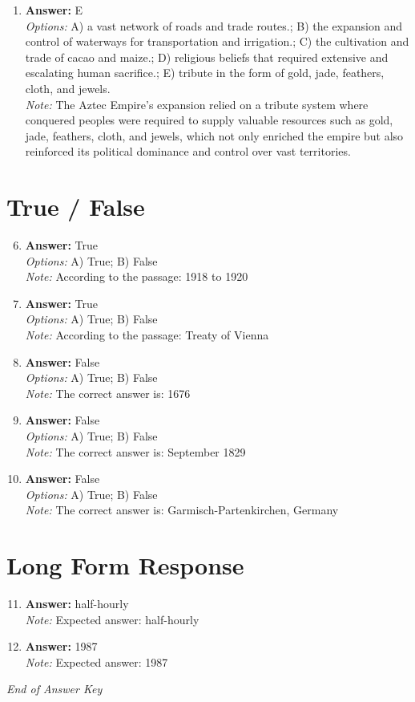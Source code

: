 \documentclass[12pt]{article}
\begin{document}
\begin{enumerate}[label=\arabic*.]
\\ \textit{Note:} The correct answer, 5100 B.P., corresponds to the earliest archaeological findings that indicate the use of metals, particularly in the context of ancient Andean civilizations, highlighting a significant development in metallurgy in South America during that period.
\item \textbf{Answer:} E
\\ \textit{Options:} A) a vast network of roads and trade routes.; B) the expansion and control of waterways for transportation and irrigation.; C) the cultivation and trade of cacao and maize.; D) religious beliefs that required extensive and escalating human sacrifice.; E) tribute in the form of gold, jade, feathers, cloth, and jewels.
\\ \textit{Note:} The Aztec Empire's expansion relied on a tribute system where conquered peoples were required to supply valuable resources such as gold, jade, feathers, cloth, and jewels, which not only enriched the empire but also reinforced its political dominance and control over vast territories.
\end{enumerate}

\section*{True / False}
\begin{enumerate}[label=\arabic*.]
\setcounter{enumi}{5}
\item \textbf{Answer:} True
\\ \textit{Options:} A) True; B) False
\\ \textit{Note:} According to the passage: 1918 to 1920
\item \textbf{Answer:} True
\\ \textit{Options:} A) True; B) False
\\ \textit{Note:} According to the passage: Treaty of Vienna
\item \textbf{Answer:} False
\\ \textit{Options:} A) True; B) False
\\ \textit{Note:} The correct answer is: 1676
\item \textbf{Answer:} False
\\ \textit{Options:} A) True; B) False
\\ \textit{Note:} The correct answer is: September 1829
\item \textbf{Answer:} False
\\ \textit{Options:} A) True; B) False
\\ \textit{Note:} The correct answer is: Garmisch-Partenkirchen, Germany
\end{enumerate}

\section*{Long Form Response}
\begin{enumerate}[label=\arabic*.]
\setcounter{enumi}{10}
\item \textbf{Answer:} half-hourly
\\ \textit{Note:} Expected answer: half-hourly
\item \textbf{Answer:} 1987
\\ \textit{Note:} Expected answer: 1987
\end{enumerate}

\vfill
\noindent\textit{End of Answer Key}
\end{document}
